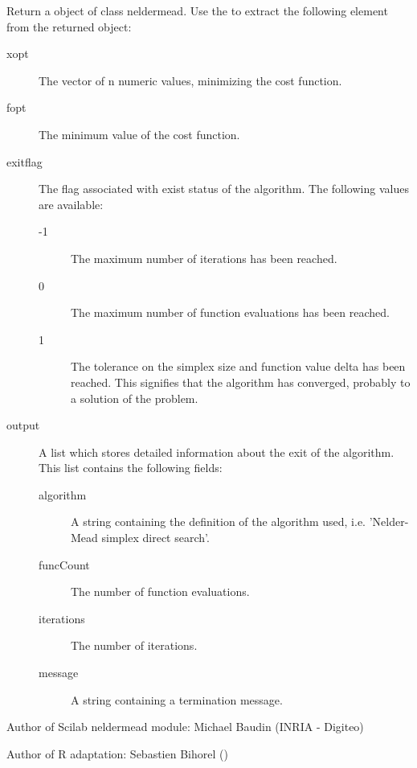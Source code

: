 \begin{Value}
Return a object of class neldermead. Use the  to extract
the following element from the returned object:\begin{description}

\item[xopt] The vector of n numeric values, minimizing the cost function.
\item[fopt] The minimum value of the cost function.
\item[exitflag] The flag associated with exist status of the algorithm.
The following values are available:\begin{description}

\item[-1] The maximum number of iterations has been reached.
\item[0] The maximum number of function evaluations has been reached.
\item[1] The tolerance on the simplex size and function value delta has
been reached. This signifies that the algorithm has converged,
probably to a solution of the problem.

\end{description}


\item[output] A list which stores detailed information about the exit of the
algorithm. This list contains the following fields:\begin{description}

\item[algorithm] A string containing the definition of the algorithm
used, i.e. 'Nelder-Mead simplex direct search'.
\item[funcCount] The number of function evaluations.
\item[iterations] The number of iterations.
\item[message] A string containing a termination message.

\end{description}



\end{description}

\end{Value}
%
\begin{Author}\relax
Author of Scilab neldermead module: Michael Baudin (INRIA - Digiteo)

Author of R adaptation: Sebastien Bihorel ()
\end{Author}
